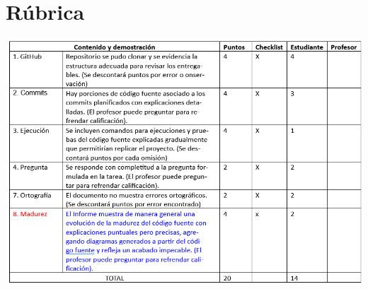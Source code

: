 \documentclass{article}
\begin{document}
\section{Rúbrica}


\includegraphics[width=\textwidth]{img/4.png}
\end{document}
